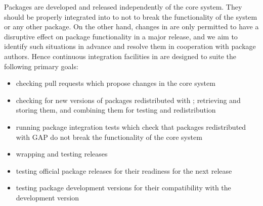 \documentclass{deliverablereport}
\begin{document}
Packages are developed and released independently of the core \GAP system.
They should be properly integrated into \GAP to not to break the functionality
of the system or any other package. On the other hand, changes in \GAP are only
permitted to have a disruptive effect on package functionality in a major
release, and we aim to identify such situations in advance and resolve them
in cooperation with package authors. Hence continuous integration facilities
in \GAP are designed to suite the following primary goals:
\begin{itemize}
\item checking pull requests which propose changes in the core \GAP system
\item checking for new versions of \GAP packages redistributed with \GAP;
retrieving and storing them, and combining them for testing and redistribution
\item running package integration tests which check that \GAP packages redistributed
with GAP do not break the functionality of the core \GAP system
\item wrapping and testing \GAP releases
\item testing official package releases for their readiness for the next \GAP release
\item testing package development versions for their compatibility with the \GAP development version
\end{itemize}
\end{document}

